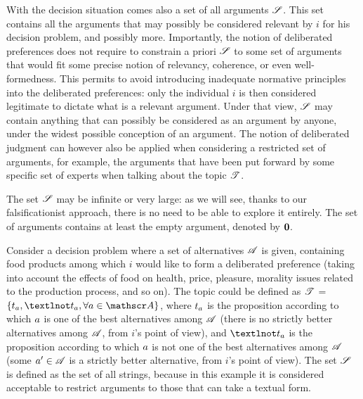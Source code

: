 \documentclass[version=last, pagesize, twoside=off, bibliography=totoc, DIV=calc, fontsize=12pt, a4paper, french, english]{scrartcl}
\begin{document}
With the decision situation comes also a set of all arguments $\mathscr{S}$. This set contains all the arguments that may possibly be considered relevant by $i$ for his decision problem, and possibly more.
Importantly, the notion of deliberated preferences does not require to constrain a priori $\mathscr{S}$ to some set of arguments that would fit some precise notion of relevancy, coherence, or even well-formedness. This permits to avoid introducing inadequate normative principles into the deliberated preferences: only the individual $i$ is then considered legitimate to dictate what is a relevant argument. Under that view, $\mathscr{S}$ may contain anything that can possibly be considered as an argument by anyone, under the widest possible conception of an argument. The notion of deliberated judgment can however also be applied when considering a restricted set of arguments, for example, the arguments that have been put forward by some specific set of experts when talking about the topic $\mathscr{T}$. 

The set $\mathscr{S}$ may be infinite or very large: as we will see, thanks to our falsificationist approach, there is no need to be able to explore it entirely. The set of arguments contains at least the empty argument, denoted by $\mathbf{0}$.

\begin{example}
	Consider a decision problem where a set of alternatives $\mathscr{A}$ is given, containing food products among which $i$ would like to form a deliberated preference (taking into account the effects of food on health, price, pleasure, morality issues related to the production process, and so on). The topic could be defined as $\mathscr{T}$ = $\set{\prop_\alt, ¬\prop_\alt, \forall \alt \in \allalts}$, where $t_a$ is the proposition according to which $a$ is one of the best alternatives among $\mathscr{A}$ (there is no strictly better alternatives among $\mathscr{A}$, from $i$’s point of view), and $¬\prop_\alt$ is the proposition according to which $a$ is not one of the best alternatives among $\mathscr{A}$ (some $a' \in \mathscr{A}$ is a strictly better alternative, from $i$’s point of view). 
	The set $\mathscr{S}$ is defined as the set of all strings, because in this example it is considered acceptable to restrict arguments to those that can take a textual form.
\end{example}
\end{document}
